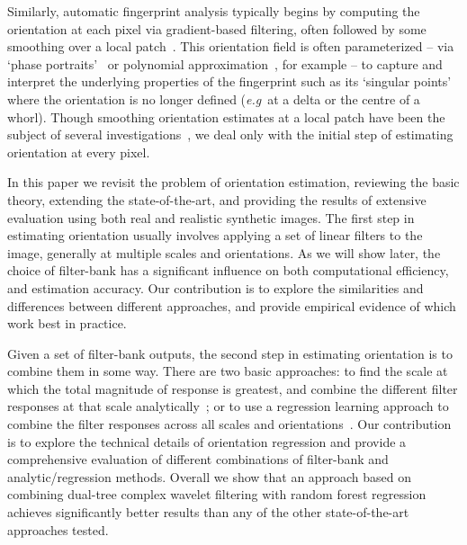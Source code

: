 \documentclass{bmvc2k}
\def\eg{\emph{e.g}\bmvaOneDot}
\begin{document}
Similarly, automatic fingerprint analysis typically begins by computing the orientation at each pixel via gradient-based filtering, often followed by some smoothing over a local patch~\cite{Bazen_Gerez_TPAMI02,Mei_etal_IVC09}. This orientation field is often parameterized -- via `phase portraits'~\cite{Li_etal_PR06} or polynomial approximation~\cite{Gu_etal_PR04}, for example -- to capture and interpret the underlying properties of the fingerprint such as its `singular points' where the orientation is no longer defined (\eg~at a delta or the centre of a whorl). Though smoothing orientation estimates at a local patch have been the subject of several investigations~\cite{Kass_Witkin_CVGIP87,Rao_Jain_TPAMI92,Perona_TIP98}, we deal only with the initial step of estimating orientation at every pixel.

In this paper we revisit the problem of orientation estimation, reviewing the basic theory, extending the state-of-the-art, and providing the results of extensive evaluation using both real and realistic synthetic images. The first step in estimating orientation usually involves applying a set of linear filters to the image, generally at multiple scales and orientations. As we will show later, the choice of filter-bank has a significant influence on both computational efficiency, and estimation accuracy. Our contribution is to explore the similarities and differences between different approaches, and provide empirical evidence of which work best in practice.

Given a set of filter-bank outputs, the second step in estimating orientation is to combine them in some way. There are two basic approaches: to find the scale at which the total magnitude of response is greatest, and combine the different filter responses at that scale analytically~\cite{Karssemeijer_teBrake_TMI96,Mei_etal_IVC09}; or to use a regression learning approach to combine the filter responses across all scales and orientations~\cite{Berks_etal_IPMI11}. Our contribution is to explore the technical details of orientation regression and provide a comprehensive evaluation of different combinations of filter-bank and analytic/regression methods. Overall we show that an approach based on combining dual-tree complex wavelet filtering with random forest regression achieves significantly better results than any of the other state-of-the-art approaches tested.
\end{document}

